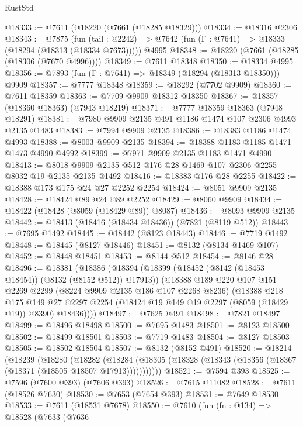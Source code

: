 \begin{lexlean}{RustStd}
\begin{coremodule}
@18333 := @7611 (@18220 (@7661 (@18285 @18329)))
@18334 := @18316 @2306
@18343 := @7875
    (fun (tail : @2242) => @7642 (fun (Γ : @7641) => @18333 (@18294 (@18313 (@18334 @7673)))))
    @4995
@18348 := @18220 (@7661 (@18285 (@18306 (@7670 @4996))))
@18349 := @7611 @18348
@18350 := @18334 @4995
@18356 := @7893 (fun (Γ : @7641) => @18349 (@18294 (@18313 @18350))) @9909
@18357 := @7777 @18348
@18359 := @18292 (@7702 @9909)
@18360 := @7611 @18359
@18363 := @7709 @9909 @18312 @18350
@18367 := @18357 (@18360 @18363) (@7943 @18219)
@18371 := @7777 @18359 @18363 (@7948 @18291)
@18381 := @7980 @9909 @2135 @491 @1186 @1474 @107 @2306 @4993 @2135 @1483
@18383 := @7994 @9909 @2135
@18386 := @18383 @1186 @1474 @4993
@18388 := @8003 @9909 @2135
@18394 := @18388 @1183 @1185 @1471 @1473 @4990 @4992
@18399 := @7971 @9909 @2135 @1183 @1471 @4990
@18413 := @8018 @9909 @2135 @512 @176 @28 @1469 @107 @2306 @2255 @8032 @19 @2135 @2135 @1492
@18416 := @18383 @176 @28 @2255
@18422 := @18388 @173 @175 @24 @27 @2252 @2254
@18424 := @8051 @9909 @2135
@18428 := @18424 @89 @24 @89 @2252
@18429 := @8060 @9909
@18434 := @18422 (@18428 (@8059 (@18429 @89)) @8087)
@18436 := @8093 @9909 @2135
@18442 := @18413 (@18416 (@18434 @18436)) (@7821 (@8119 @512))
@18443 := @7695 @1492
@18445 := @18442 (@8123 @18443)
@18446 := @7719 @1492
@18448 := @18445 (@8127 @18446)
@18451 := @8132 (@8134 @1469 @107)
@18452 := @18448 @18451
@18453 := @8144 @512
@18454 := @8146 @28
@18496 := @18381
    (@18386
      (@18394
        (@18399 (@18452 (@8142 (@18453 @18454)) (@8132 (@8152 @512)) @17913))
        (@18388
          @189
          @220
          @107
          @151
          @2269
          @2299
          (@8224 @9909 @2135 @186 @107 @2268 @8236)
          (@18388
            @218
            @175
            @149
            @27
            @2297
            @2254
            (@18424 @19 @149 @19 @2297 (@8059 (@18429 @19)) @8390)
            @18436))))
@18497 := @7625 @491
@18498 := @7821 @18497
@18499 := @18496 @18498
@18500 := @7695 @1483
@18501 := @8123 @18500
@18502 := @18499 @18501
@18503 := @7719 @1483
@18504 := @8127 @18503
@18505 := @18502 @18504
@18507 := @8132 (@8152 @491)
@18520 := @18214
    (@18239
      (@18280
        (@18282
          (@18284 (@18305 (@18328 (@18343 (@18356 (@18367 (@18371 (@18505 @18507 @17913)))))))))))
@18521 := @7594 @393
@18525 := @7596 (@7600 @393) (@7606 @393)
@18526 := @7615 @11082
@18528 := @7611 (@18526 @7630)
@18530 := @7653 (@7654 @393)
@18531 := @7649 @18530
@18533 := @7611 (@18531 @7678)
@18550 := @7610
    (fun (fn : @134) =>
    @18528
      (@7633
        (@7636

\end{coremodule}
\end{lexlean}
